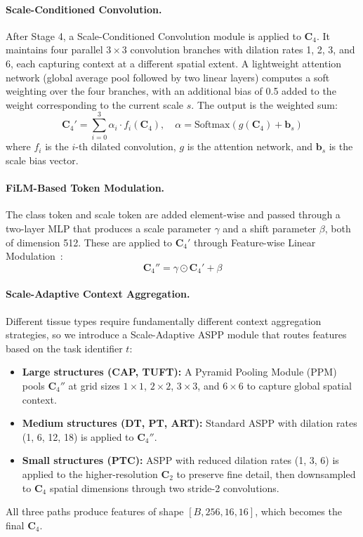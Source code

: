 \documentclass[runningheads]{llncs}
\begin{document}
\paragraph{Scale-Conditioned Convolution.}
After Stage 4, a Scale-Conditioned Convolution module is applied to $\mathbf{C}_4$. It maintains four parallel $3 \times 3$ convolution branches with dilation rates 1, 2, 3, and 6, each capturing context at a different spatial extent. A lightweight attention network (global average pool followed by two linear layers) computes a soft weighting over the four branches, with an additional bias of 0.5 added to the weight corresponding to the current scale $s$. The output is the weighted sum:
\begin{equation}
    \mathbf{C}_4' = \sum_{i=0}^{3} \alpha_i \cdot f_i(\mathbf{C}_4), \quad \alpha = \text{Softmax}(g(\mathbf{C}_4) + \mathbf{b}_s)
\end{equation}
where $f_i$ is the $i$-th dilated convolution, $g$ is the attention network, and $\mathbf{b}_s$ is the scale bias vector.

\paragraph{FiLM-Based Token Modulation.}
The class token and scale token are added element-wise and passed through a two-layer MLP that produces a scale parameter $\gamma$ and a shift parameter $\beta$, both of dimension 512. These are applied to $\mathbf{C}_4'$ through Feature-wise Linear Modulation~\cite{perez2018film}:
\begin{equation}
    \mathbf{C}_4'' = \gamma \odot \mathbf{C}_4' + \beta
\end{equation}

\paragraph{Scale-Adaptive Context Aggregation.}
Different tissue types require fundamentally different context aggregation strategies, so we introduce a Scale-Adaptive ASPP module that routes features based on the task identifier $t$:
\begin{itemize}
    \item \textbf{Large structures (CAP, TUFT):} A Pyramid Pooling Module (PPM)~\cite{zhao2017pspnet} pools $\mathbf{C}_4''$ at grid sizes $1\!\times\!1$, $2\!\times\!2$, $3\!\times\!3$, and $6\!\times\!6$ to capture global spatial context.
    \item \textbf{Medium structures (DT, PT, ART):} Standard ASPP with dilation rates (1, 6, 12, 18) is applied to $\mathbf{C}_4''$.
    \item \textbf{Small structures (PTC):} ASPP with reduced dilation rates (1, 3, 6) is applied to the higher-resolution $\mathbf{C}_2$ to preserve fine detail, then downsampled to $\mathbf{C}_4$ spatial dimensions through two stride-2 convolutions.
\end{itemize}
All three paths produce features of shape $[B, 256, 16, 16]$, which becomes the final $\mathbf{C}_4$.
\end{document}
